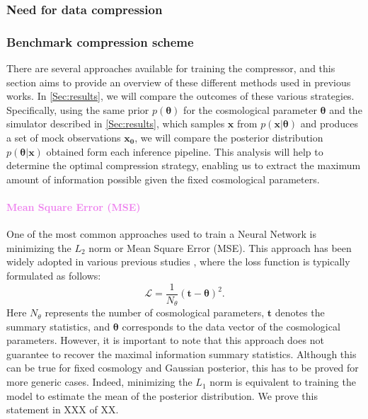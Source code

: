 \documentclass{aa}
\begin{document}
\subsubsection{Need for data compression}
\subsubsection{Benchmark compression scheme}
There are several approaches available for training the compressor, and this section aims to provide an overview of these different methods used in previous works. 
In \autoref{Sec:results}, we will compare the outcomes of these various strategies. Specifically, using the same prior $p(\bm {\theta})$ for the cosmological parameter $\bm{\theta}$ and the simulator described in \autoref{Sec:results}, which samples $\bm {x}$ from $p(\bm{x}| \bm{\theta})$ and produces a set of mock observations $\bm{x_0}$, we will compare the posterior distribution $p(\bm{\theta}|\bm{x})$ obtained form each inference pipeline. This analysis will help to determine the optimal compression strategy, enabling us to extract the maximum amount of information possible given the fixed cosmological parameters.
\paragraph{\textcolor{violet}{Mean Square Error (MSE)}}
One of the most common approaches used to train a Neural Network is minimizing the $L_2$ norm or Mean Square Error (MSE).
This approach has been widely adopted in various previous studies  \citep{ribli2018improved, lu2022simultaneously, lu2023cosmological}, where the loss function is typically formulated as follows:
\begin{equation}
   \mathcal{L}=\frac{1}{N_{\theta}}(\bm{t}-\bm{\theta})^2.
\end{equation}
Here $N_{\theta}$ represents the number of cosmological parameters, $\bm{t}$ denotes the summary statistics, and $\bm{\theta}$ corresponds to the data vector of the cosmological parameters. 
However, it is important to note that this approach does not guarantee to recover the maximal information summary statistics. Although this can be true for fixed cosmology and Gaussian posterior, this has to be proved for more generic cases. Indeed, minimizing the $L_{1}$ norm is equivalent to training the model to estimate the mean of the posterior distribution. We prove this statement in XXX of XX.
\end{document}
